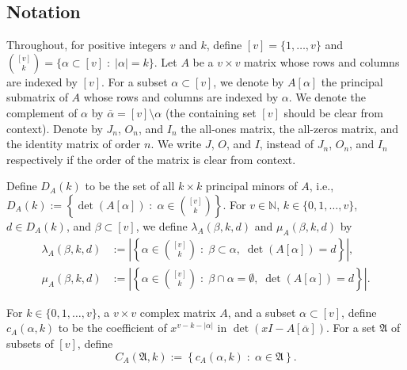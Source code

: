 \documentclass[11pt]{article}
\begin{document}
\subsection{Notation}

\label{sec:notnprelim}

Throughout, for positive integers $v$ and $k$, define $[v]=\{1,\ldots,v\}$ and $\binom{[v]}{k}=\{\alpha \subset [v]  \; : \; |\alpha|=k\}$. 
Let $A$ be a $v\times v$ matrix whose rows and columns are indexed by $[v]$. 
For a subset $\alpha \subset[v]$, we denote by $A[\alpha]$ the principal submatrix of $A$ whose rows and columns are indexed by $\alpha$. 
We denote the complement of $\alpha$ by $\overline{\alpha}=[v]\setminus \alpha$ (the containing set $[v]$ should be clear from context).
Denote by $J_n$, $O_n$, and $I_n$ the all-ones matrix, the all-zeros matrix, and the identity matrix of order $n$.
We write $J$, $O$, and $I$, instead of $J_n$, $O_n$, and $I_n$ respectively if the order of the matrix is clear from context.

Define $D_A(k)$ to be the set of all $k\times k$ principal minors of $A$, i.e., $D_A(k) := \left \{ \det(A[\alpha]) \; : \; \alpha \in \binom{[v]}{k} \right \}$.
For $v \in \mathbb N$, $k \in \{0,1,\dots,v\}$, $d \in D_A(k)$, and $\beta \subset [v]$, we define $\lambda_A(\beta,k,d)$ and $\mu_A(\beta,k,d)$ by 
\begin{align*}
\lambda_A(\beta,k,d)& :=\left|\left\{\alpha \in \binom{[v]}{k} \; : \; \beta \subset \alpha, \; \det (A[\alpha])=d\right\}\right|,\\
\mu_A(\beta,k,d)& :=\left|\left\{\alpha \in \binom{[v]}{k} \; : \; \beta \cap \alpha=\emptyset, \; \det (A[\alpha])=d\right\}\right|. 
\end{align*}

For $k \in \{0,1,\dots,v\}$, a $v\times v$ complex matrix $A$, and a subset $\alpha \subset [v]$, define $c_{A}(\alpha,k)$ to be the coefficient of $x^{v-k-|\alpha|}$ in $\det(xI-A[\overline{\alpha}])$.
For a set $\mathfrak A$ of subsets of $[v]$, define
\[
C_{A}(\mathfrak A,k) := \left \{ c_{A}(\alpha,k) \; : \; \alpha \in \mathfrak A \right \}.
\]
\end{document}

